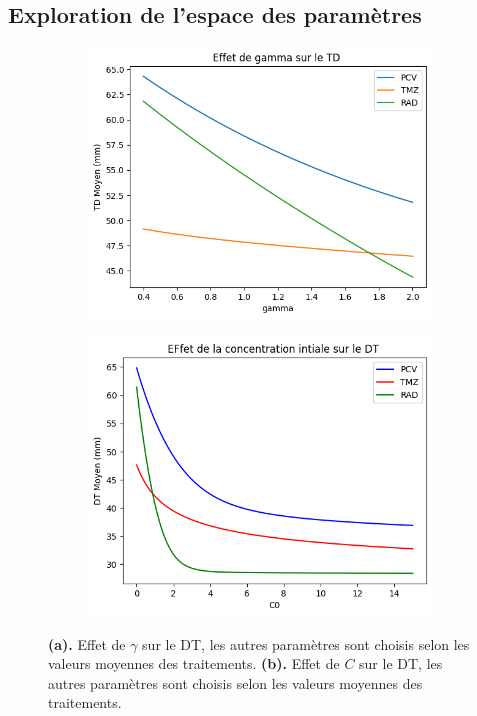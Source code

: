 \documentclass[12pt]{article}
\begin{document}
\subsection{Exploration de l'espace des paramètres}

\begin{figure}
    \centering
    \begin{subfigure}[t]{0.45\textwidth}
        \centering
        \includegraphics[width=\linewidth]{Image/effet_gamma.png} 
        \caption{} \label{fig:effet_C}
    \end{subfigure}
    \hfill
    \begin{subfigure}[t]{0.45\textwidth}
        \centering
        \includegraphics[width=\linewidth]{Image/effet_C.png} 
        \caption{} \label{fig:effet_gamma}
    \end{subfigure}

    \caption{\textbf{(a).} Effet de $\gamma$ sur le DT, les autres paramètres sont choisis selon les valeurs moyennes des traitements. \textbf{(b).} Effet de $C$ sur le DT, les autres paramètres sont choisis selon les valeurs moyennes des traitements.}
\end{figure}
\end{document}
